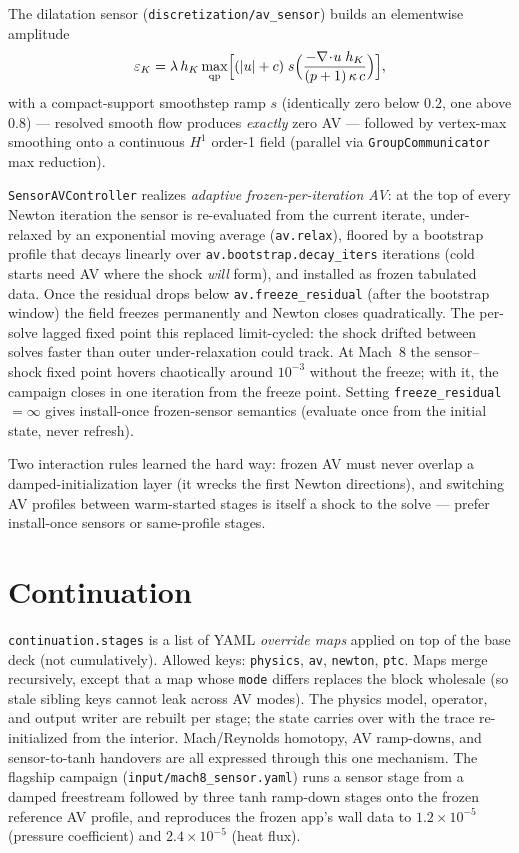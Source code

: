 \documentclass[11pt]{article}
\newcommand{\code}[1]{\texttt{#1}}
\begin{document}
The dilatation sensor (\code{discretization/av\_sensor}) builds an
elementwise amplitude
\begin{equation}
  \varepsilon_K = \lambda\, h_K \max_{\mathrm{qp}}
     \Bigl[ (|u| + c)\; s\Bigl(
        \frac{-\nabla\!\cdot\!u\; h_K}{(p+1)\,\kappa\, c}\Bigr) \Bigr],
\end{equation}
with a compact-support smoothstep ramp $s$ (identically zero below
$0.2$, one above $0.8$) --- resolved smooth flow produces \emph{exactly}
zero AV --- followed by vertex-max smoothing onto a continuous $H^1$
order-1 field (parallel via \code{GroupCommunicator} max reduction).

\code{SensorAVController} realizes \emph{adaptive frozen-per-iteration
AV}: at the top of every Newton iteration the sensor is re-evaluated
from the current iterate, under-relaxed by an exponential moving
average (\code{av.relax}), floored by a bootstrap profile that decays
linearly over \code{av.bootstrap.decay\_iters} iterations (cold starts
need AV where the shock \emph{will} form), and installed as frozen
tabulated data. Once the residual drops below
\code{av.freeze\_residual} (after the bootstrap window) the field
freezes permanently and Newton closes quadratically. The per-solve
lagged fixed point this replaced limit-cycled: the shock drifted
between solves faster than outer under-relaxation could track. At
Mach~8 the sensor--shock fixed point hovers chaotically around
$10^{-3}$ without the freeze; with it, the campaign closes in one
iteration from the freeze point. Setting
\code{freeze\_residual} $=\infty$ gives install-once frozen-sensor
semantics (evaluate once from the initial state, never refresh).

Two interaction rules learned the hard way: frozen AV must never
overlap a damped-initialization layer (it wrecks the first Newton
directions), and switching AV profiles between warm-started stages is
itself a shock to the solve --- prefer install-once sensors or
same-profile stages.

\section{Continuation}

\code{continuation.stages} is a list of YAML \emph{override maps}
applied on top of the base deck (not cumulatively). Allowed keys:
\code{physics}, \code{av}, \code{newton}, \code{ptc}. Maps merge
recursively, except that a map whose \code{mode} differs replaces the
block wholesale (so stale sibling keys cannot leak across AV modes).
The physics model, operator, and output writer are rebuilt per stage;
the state carries over with the trace re-initialized from the interior.
Mach/Reynolds homotopy, AV ramp-downs, and sensor-to-tanh handovers are
all expressed through this one mechanism. The flagship campaign
(\code{input/mach8\_sensor.yaml}) runs a sensor stage from a damped
freestream followed by three tanh ramp-down stages onto the frozen
reference AV profile, and reproduces the frozen app's wall data to
$1.2\times10^{-5}$ (pressure coefficient) and $2.4\times10^{-5}$ (heat
flux).
\end{document}
